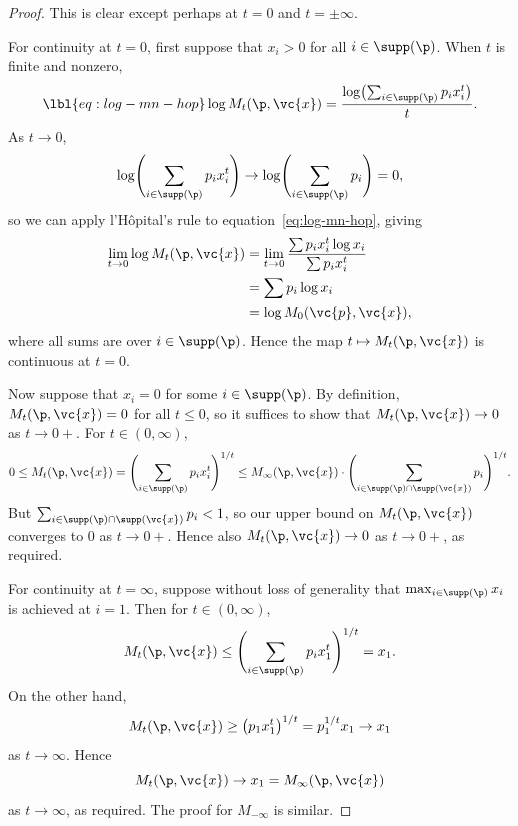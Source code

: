 \begin{proof}
This is clear except perhaps at $t = 0$ and $t = \pm \infty$.  

For continuity at $t = 0$, first suppose that $x_i > 0$ for all $i \in
\supp(\p)$.  When $t$ is finite and nonzero, 
% 
\begin{equation}
\lbl{eq:log-mn-hop}
\log M_t(\p, \vc{x})
=
\frac{\log \bigl(\sum_{i \in \supp(\p)} p_i x_i^t\bigr)}{t}.
\end{equation}
% 
As $t \to 0$, 
\[
\log \Biggl(\sum_{i \in \supp(\p)} p_i x_i^t\Biggr)
\to
\log \Biggl(\sum_{i \in \supp(\p)} p_i\Biggr)
=
0,
\]
so we can apply l'H\^opital's rule to equation~\eqref{eq:log-mn-hop}, giving
% 
\begin{align*}
\lim_{t \to 0} \log M_t(\p, \vc{x})     &
=
\lim_{t \to 0} 
\frac{\sum p_i x_i^t \log x_i}{\sum p_i x_i^t}  \\
&
=
\sum p_i \log x_i       \\
&
=
\log M_0(\vc{p}, \vc{x}),
\end{align*}
% 
where all sums are over $i \in \supp(\p)$.  Hence the map $t \mapsto M_t(\p,
\vc{x})$ is continuous at $t = 0$.   

Now suppose that $x_i = 0$ for some $i \in \supp(\p)$.  By definition,
$M_t(\p, \vc{x}) = 0$ for all $t \leq 0$, so it suffices to show that
$M_t(\p, \vc{x}) \to 0$ as $t \to {0+}$.  For $t \in (0, \infty)$,
\[
0 
\leq 
M_t(\p, \vc{x}) 
=
\Biggl( \sum_{i \in \supp(\p)} p_i x_i^t \Biggr)^{1/t}
\leq 
M_\infty(\p, \vc{x}) \cdot
\Biggl(\sum_{i \in \supp(\p) \cap \supp(\vc{x})} p_i\Biggr)^{1/t}.
\]
But $\sum_{i \in \supp(\p) \cap \supp(\vc{x})} p_i < 1$, so our upper
  bound on $M_t(\p, \vc{x})$ converges to $0$ as $t \to {0+}$.  Hence also
  $M_t(\p, \vc{x}) \to 0$ as $t \to {0+}$, as required.

For continuity at $t = \infty$, suppose without loss of generality that
$\max_{i \in \supp(\p)} x_i$ is achieved at $i = 1$.  Then for $t \in (0,
\infty)$, 
\[
M_t(\p, \vc{x}) 
\leq
\Biggl( \sum_{i \in \supp(\p)} p_i x_1^t \Biggr)^{1/t}
=
x_1.
\]
On the other hand,
\[
M_t(\p, \vc{x}) 
\geq
\bigl( p_1 x_1^t \bigr)^{1/t}
=
p_1^{1/t} x_1
\to
x_1
\]
as $t \to \infty$.  Hence 
\[
M_t(\p, \vc{x}) \to x_1 = M_\infty(\p, \vc{x})
\]
as $t \to \infty$, as required.  The proof for $M_{-\infty}$ is similar.
\end{proof}

